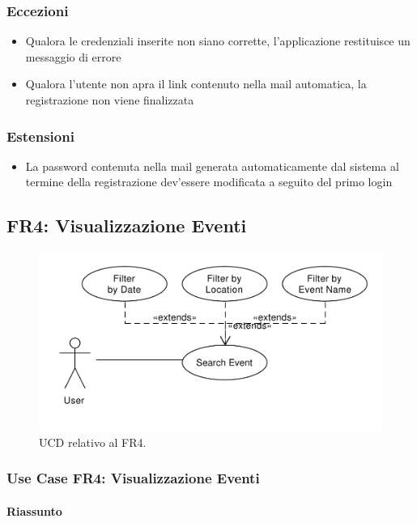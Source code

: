\documentclass[9pt]{extarticle}
\begin{document}
\subsubsection*{Eccezioni}\label{Eccezioni-FR2}

\begin{itemize}
	\item Qualora le credenziali inserite non siano corrette, l'applicazione restituisce un messaggio di errore
	\item Qualora l'utente non apra il link contenuto nella mail automatica, la registrazione non viene finalizzata
\end{itemize}

\subsubsection*{Estensioni}\label{Estensioni-FR2}

\begin{itemize}
	\item La password contenuta nella mail generata automaticamente dal sistema al termine della registrazione dev'essere modificata a seguito del primo login
\end{itemize}

\subsection{FR4: Visualizzazione Eventi}

\begin{figure}[!htb]
	\centering
	\includegraphics[width=.7\linewidth]{./images/FR4.pdf}
	\caption{UCD relativo al FR4.}
	\label{fig:UCD_FR4}
\end{figure}

\subsubsection*{Use Case FR4: Visualizzazione Eventi}

\paragraph{Riassunto}
\end{document}

